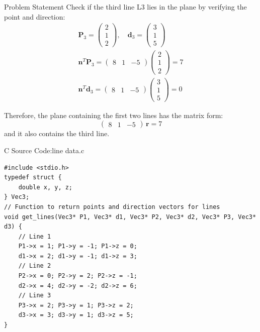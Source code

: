 \documentclass{beamer}
\numberwithin{equation}{section}
\theoremstyle{remark}
\newcommand{\myvec}[1]{\ensuremath{\begin{pmatrix}#1\end{pmatrix}}}
\let\vec\mathbf
\begin{document}
\begin{frame}{Problem Statement}
\noindent Check if the third line L3 lies in the plane by verifying the point and direction:
\begin{align}
\vec{P}_3 = \myvec{2\\1\\2}, \quad \vec{d}_3 = \myvec{3\\1\\5} \\
\vec{n}^T \vec{P}_3 = \myvec{8 & 1 & -5}\myvec{2\\1\\2} = 7 \\
\vec{n}^T \vec{d}_3 = \myvec{8 & 1 & -5}\myvec{3\\1\\5} = 0
\end{align}

\noindent Therefore, the plane containing the first two lines has the matrix form:
\[
\myvec{8 & 1 & -5}\,\vec{r} = 7
\]  
and it also contains the third line.

\end{frame}



\begin{frame}[fragile]{C Source Code:line data.c}
\begin{verbatim}
#include <stdio.h>
typedef struct {
    double x, y, z;
} Vec3;
// Function to return points and direction vectors for lines
void get_lines(Vec3* P1, Vec3* d1, Vec3* P2, Vec3* d2, Vec3* P3, Vec3* d3) {
    // Line 1
    P1->x = 1; P1->y = -1; P1->z = 0;
    d1->x = 2; d1->y = -1; d1->z = 3;
    // Line 2
    P2->x = 0; P2->y = 2; P2->z = -1;
    d2->x = 4; d2->y = -2; d2->z = 6;
    // Line 3
    P3->x = 2; P3->y = 1; P3->z = 2;
    d3->x = 3; d3->y = 1; d3->z = 5;
}
\end{verbatim}
\end{frame}
\end{document}
